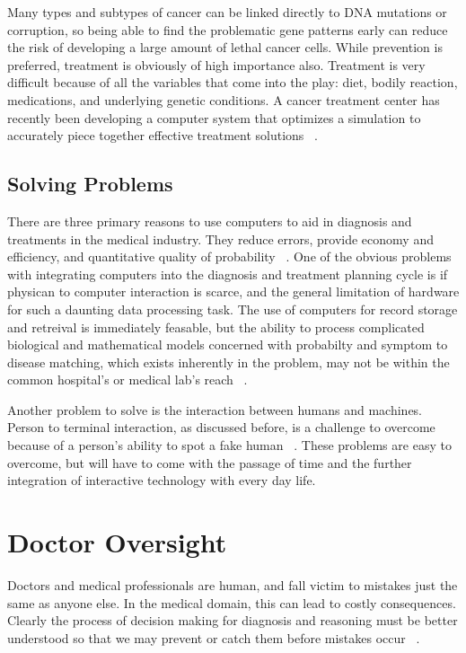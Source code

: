 \documentclass[11pt]{article}
\newcommand{\tab}{\hspace*{2em}}
\begin{document}
\begin{doublespace}
\tab Many types and subtypes of cancer can be linked directly to DNA mutations or corruption, so being able to find the
problematic gene patterns early can reduce the risk of developing a large amount of lethal cancer cells. While prevention
is preferred, treatment is obviously of high importance also. Treatment is very difficult because of all the variables that 
come into the play: diet, bodily reaction, medications, and underlying genetic conditions. A cancer treatment center has 
recently been developing a computer system that optimizes a simulation to accurately piece together effective treatment 
solutions ~\cite{Baesler:2001:HIM:564124.564329}. 

\subsection{Solving Problems}

\tab There are three primary reasons to use computers to aid in diagnosis and treatments in the medical industry. They reduce
errors, provide economy and efficiency, and quantitative quality of probability ~\cite{Yarnall:1966:CAM:800256.810706}. One of 
the obvious problems with integrating computers into the diagnosis and treatment planning cycle is if physican to computer
interaction is scarce, and the general limitation of hardware for such a daunting data processing task. The use of computers
for record storage and retreival is immediately feasable, but the ability to process complicated biological and mathematical
models concerned with probabilty and symptom to disease matching, which exists inherently in the problem, may not be within
the common hospital's or medical lab's reach ~\cite{Yarnall:1966:CAM:800256.810706}. 

\tab Another problem to solve is the interaction between humans and machines. Person to terminal interaction, as discussed 
before, is a challenge to overcome because of a person's ability to spot a fake human ~\cite{Barnett:1987:HDM:41526.41531}. 
These problems are easy to overcome, but will have to come with the passage of time and the further integration of interactive
technology with every day life. 

\section{Doctor Oversight}

\tab Doctors and medical professionals are human, and fall victim to mistakes just the same as anyone else. In the medical 
domain, this can lead to costly consequences. Clearly the process of decision making for diagnosis and reasoning must be 
better understood so that we may prevent or catch them before mistakes occur ~\cite{McCoy:2012:LUP:2392701.2392704}. 


\end{doublespace}
\end{document}
